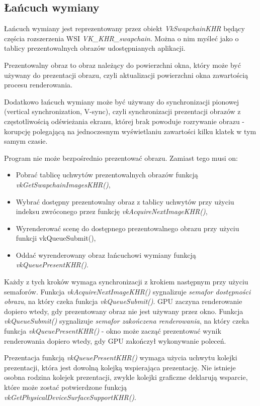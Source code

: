 \subsection{Łańcuch wymiany}

Łańcuch wymiany jest reprezentowany przez obiekt \textit{VkSwapchainKHR} będący częścia rozszerzenia WSI \textit{VK\_KHR\_swapchain}. Można o nim myśleć jako o tablicy prezentowalnych obrazów udostępnianych aplikacji.

Prezentowalny obraz to obraz należący do powierzchni okna, który może być używany do prezentacji obrazu, czyli aktualizacji powierzchni okna zawartością procesu renderowania.

Dodatkowo łańcuch wymiany może być używany do synchronizacji pionowej (vertical synchronization, V-sync), czyli synchronizacji prezentacji obrazów z częstotliwością
odświeżania ekranu, której brak powoduje rozrywanie obrazu - korupcję polegającą na jednoczesnym wyświetlaniu zawartości
kilku klatek w tym samym czasie.

Program nie może bezpośrednio prezentować obrazu. Zamiast tego musi on:
\begin{itemize}
	\item Pobrać tablicę uchwytów prezentowalnych obrazów funkcją \textit{vkGetSwapchainImagesKHR()},
	\item Wybrać dostępny prezentowalny obraz z tablicy uchwytów przy użyciu indeksu zwróconego przez funkcję \textit{vkAcquireNextImageKHR()},
	\item Wyrenderować scenę do dostępnego prezentowalnego obrazu przy użyciu funkcji vkQueueSubmit(),
	\item Oddać wyrenderowany obraz łańcuchowi wymiany funkcją \textit{vkQueuePresentKHR()}.
\end{itemize}
Każdy z tych kroków wymaga synchronizacji z krokiem następnym przy użyciu semaforów. Funkcja \textit{vkAcquireNextImageKHR()} sygnalizuje \textit{semafor dostępności obrazu}, na który czeka funkcja \textit{vkQueueSubmit()}. GPU zaczyna renderowanie dopiero wtedy, gdy prezentowany obraz nie jest używany przez okno.
Funkcja \textit{vkQueueSubmit()} sygnalizuje \textit{semafor zakończena renderowania}, na który czeka funkcja \textit{vkQueuePresentKHR()} - okno może zacząć prezentować wynik renderowania dopiero wtedy, gdy GPU zakończył wykonywanie poleceń.

Prezentacja funkcją \textit{vkQueuePresentKHR()} wymaga użycia uchwytu kolejki prezentacji, która jest dowolną kolejką wspierająca prezentację.
Nie istnieje osobna rodzina kolejek prezentacji, zwykle kolejki graficzne deklarują wsparcie, które może zostać potwierdzone funkcją \textit{vkGetPhysicalDeviceSurfaceSupportKHR()}.

